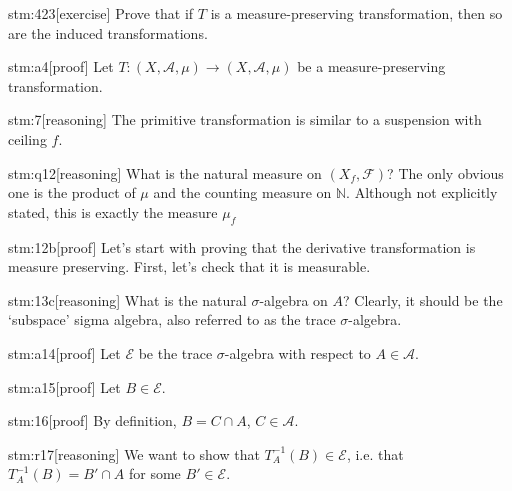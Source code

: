 \documentclass{article}
\begin{document}

\begin{stm}{stm:423}[exercise]
Prove that if $T$ is a measure-preserving transformation, then so are the induced transformations.
\end{stm}


\begin{stm}{stm:a4}[proof]
Let $T : (X, \mathcal{A}, \mu) \to (X, \mathcal{A}, \mu)$ be a measure-preserving transformation.
\end{stm}

\begin{stm}{stm:7}[reasoning]
The primitive transformation is similar to a suspension with ceiling $f$.
\end{stm}

\begin{stm}{stm:q12}[reasoning]
What is the natural measure on $(X_f, \mathcal{F})$? The only obvious one is the product of $\mu$ and the counting measure on $\mathbb{N}$. Although not explicitly stated, this is exactly the measure $\mu_f$
\end{stm}

\begin{stm}{stm:12b}[proof]
Let's start with proving that the derivative transformation is measure preserving. First, let's check that it is measurable. 
\end{stm}

\begin{stm}{stm:13c}[reasoning]
What is the natural $\sigma$-algebra on $A$? Clearly, it should be the ‘subspace’ sigma algebra, also referred to as the trace $\sigma$-algebra.
\end{stm}

\begin{stm}{stm:a14}[proof]
Let $\mathcal{E}$ be the trace $\sigma$-algebra with respect to $A \in \mathcal{A}$.
\end{stm}

\begin{stm}{stm:a15}[proof]
Let $B \in \mathcal{E}$.
\end{stm}

\begin{stm}{stm:16}[proof]
By definition, $B = C \cap A$, $C \in \mathcal{A}$.
\end{stm}

\begin{stm}{stm:r17}[reasoning]
We want to show that $T_A^{-1}(B) \in \mathcal{E}$, i.e. that $T_A^{-1}(B) = B' \cap A$ for some $B' \in \mathcal{E}$.
\end{stm}
\end{document}

